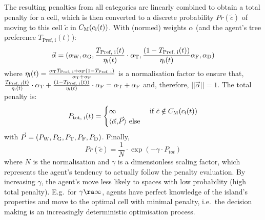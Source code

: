 The resulting penalties from all categories are linearly combined to obtain a total penalty for a cell, which is then converted to a discrete probability $Pr(\tilde{c})$ of moving to this cell $\tilde{c}$ in $C_{\rm M}(c_{\rm i}(t))$.
With (normed) weights $\alpha$ (and the agent's tree preference $T_\text{Pref, i}(t)$):
\begin{equation}
\vec{\alpha} = (\alpha_{\rm W}, \alpha_{\rm G}, \frac{T_\text{Pref, i}(t)}{\eta_{\rm i}(t)} \cdot \alpha_{\rm T}, \frac{(1-T_\text{Pref, i}(t))}{\eta_{\rm i}(t)} \alpha_{\rm F}, \alpha_{\rm D})
\end{equation} 
where $\eta_{\rm i}(t) = \frac{\alpha_{\rm T} T_\text{Pref, i}+ \alpha_{\rm F} (1-T_\text{Pref, i})}{\alpha_{\rm T}+\alpha_{\rm F}}$ is a normalisation factor to ensure that, $\frac{T_\text{Pref, i}(t)}{\eta_{\rm i}(t)}\cdot \alpha_{\rm T} + \frac{(1-T_\text{Pref, i}(t))}{\eta_{\rm i}(t)} \cdot \alpha_{\rm F} = \alpha_{\rm T}+ \alpha_{\rm F}$ and, therefore, $||\vec{\alpha}||=1$. 
The total penalty is:
\begin{equation}
P_\text{tot, i}(t) =  \begin{cases} \infty & \text{ if } \tilde{c}\notin C_{\rm M}(c_{\rm i}(t))\\
	 \langle \vec{\alpha}{, } \vec{P} \rangle \text{ else}
	 \end{cases}
\end{equation}
with $\vec{P} = (P_{\rm W}, P_{\rm G}, P_{\rm T}, P_{\rm F}, P_{\rm D})$.
Finally, 
\begin{equation}
	Pr(\tilde{c})  = \frac{1}{N} \cdot \exp \left( - \gamma \cdot P_{tot} \right) 
\end{equation}
where $N$ is the normalisation and $\gamma$ is a dimensionless scaling factor, which represents the agent's tendency to actually follow the penalty evaluation. 
By increasing $\gamma$, the agent's move less likely to spaces with low probability (high total penalty). 
E.g.\ for $\gamma \ra \infty$, agents have perfect knowledge of the island's properties and move to the optimal cell with minimal penalty, i.e.\ the decision making is an increasingly deterministic optimisation process\footnotemark.
